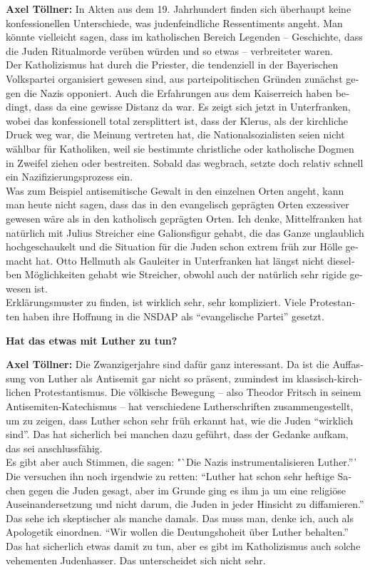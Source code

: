 \begin{otherlanguage}{ngerman}
\textbf{Axel Töllner:} In Akten aus dem 19. Jahrhundert finden sich überhaupt keine konfessionellen Unterschiede, was judenfeindliche Ressentiments angeht. Man könnte vielleicht sagen, dass im katholischen Bereich Legenden – Geschichte, dass die Juden Ritualmorde verüben würden und so etwas – verbreiteter waren.\\ 
Der Katholizismus hat durch die Priester, die tendenziell in der Bayerischen Volkspartei organisiert gewesen sind, aus parteipolitischen Gründen zunächst gegen die Nazis opponiert. Auch die Erfahrungen aus dem Kaiserreich haben bedingt, dass da eine gewisse Distanz da war. Es zeigt sich jetzt in Unterfranken, wobei das konfessionell total zersplittert ist, dass der Klerus, als der kirchliche Druck weg war, die Meinung vertreten hat, die Nationalsozialisten seien nicht wählbar für Katholiken, weil sie bestimmte christliche oder katholische Dogmen in Zweifel ziehen oder bestreiten. Sobald das wegbrach, setzte doch relativ schnell ein Nazifizierungsprozess ein.\\ 
Was zum Beispiel antisemitische Gewalt in den einzelnen Orten angeht, kann man heute nicht sagen, dass das in den evangelisch geprägten Orten exzessiver gewesen wäre als in den katholisch geprägten Orten. Ich denke, Mittelfranken hat natürlich mit Julius Streicher eine Galionsfigur gehabt, die das Ganze unglaublich hochgeschaukelt und die Situation für die Juden schon extrem früh zur Hölle gemacht hat. Otto Hellmuth als Gauleiter in Unterfranken hat längst nicht dieselben Möglichkeiten gehabt wie Streicher, obwohl auch der natürlich sehr rigide gewesen ist.\\  
Erklärungsmuster zu finden, ist wirklich sehr, sehr kompliziert. Viele Protestanten haben ihre Hoffnung in die NSDAP als "`evangelische Partei"' gesetzt.

\textbf{Hat das etwas mit Luther zu tun?} 

\textbf{Axel Töllner:} Die Zwanzigerjahre sind dafür ganz interessant. Da ist die Auffassung von Luther als Antisemit gar nicht so präsent, zumindest im klassisch-kirchlichen Protestantismus. Die völkische Bewegung – also Theodor Fritsch in seinem Antisemiten-Katechismus – hat verschiedene Lutherschriften zusammengestellt, um zu zeigen, dass Luther schon sehr früh erkannt hat, wie die Juden "`wirklich sind"'. Das hat sicherlich bei manchen dazu geführt, dass der Gedanke aufkam, das sei anschlussfähig. \\
Es gibt aber auch Stimmen, die sagen: "`Die Nazis instrumentalisieren Luther.'''  Die versuchen ihn noch irgendwie zu retten: "`Luther hat schon sehr heftige Sachen gegen die Juden gesagt, aber im Grunde ging es ihm ja um eine religiöse Auseinandersetzung und nicht darum, die Juden in jeder Hinsicht zu diffamieren."' Das sehe ich skeptischer als manche damals. Das muss man, denke ich, auch als Apologetik einordnen. "`Wir wollen die Deutungshoheit über Luther behalten."' Das hat sicherlich etwas damit zu tun, aber es gibt im Katholizismus auch solche vehementen Judenhasser. Das unterscheidet sich nicht sehr. 


\end{otherlanguage}
